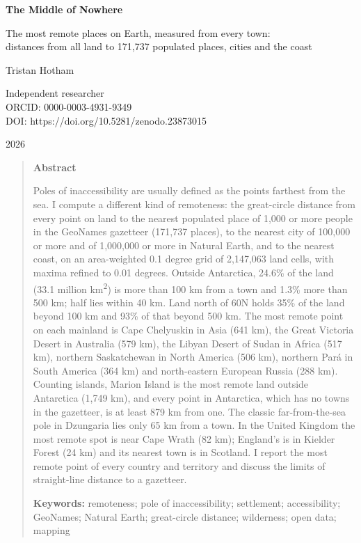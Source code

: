 \documentclass[11pt,a4paper]{article}
\begin{document}
\begin{center}
{\Large\bfseries The Middle of Nowhere\par}
\vspace{0.4em}
{\large The most remote places on Earth, measured from every town:\\distances from all land to 171,737 populated places, cities and the coast\par}
\vspace{1.2em}
{\large Tristan Hotham\par}
\vspace{0.3em}
{\small Independent researcher\\
ORCID: 0000-0003-4931-9349\\
DOI: https://doi.org/10.5281/zenodo.23873015\par}
\vspace{0.8em}
2026
\end{center}

\begin{quote}
\small
\begin{center}\textbf{Abstract}\end{center}
Poles of inaccessibility are usually defined as the points farthest from the sea. I compute a different kind of remoteness: the great-circle distance from every point on land to the nearest populated place of 1,000 or more people in the GeoNames gazetteer (171,737 places), to the nearest city of 100,000 or more and of 1,000,000 or more in Natural Earth, and to the nearest coast, on an area-weighted 0.1 degree grid of 2,147,063 land cells, with maxima refined to 0.01 degrees. Outside Antarctica, 24.6\% of the land (33.1 million km\textsuperscript{2}) is more than 100 km from a town and 1.3\% more than 500 km; half lies within 40 km. Land north of 60\textdegree N holds 35\% of the land beyond 100 km and 93\% of that beyond 500 km. The most remote point on each mainland is Cape Chelyuskin in Asia (641 km), the Great Victoria Desert in Australia (579 km), the Libyan Desert of Sudan in Africa (517 km), northern Saskatchewan in North America (506 km), northern Par\'a in South America (364 km) and north-eastern European Russia (288 km). Counting islands, Marion Island is the most remote land outside Antarctica (1,749 km), and every point in Antarctica, which has no towns in the gazetteer, is at least 879 km from one. The classic far-from-the-sea pole in Dzungaria lies only 65 km from a town. In the United Kingdom the most remote spot is near Cape Wrath (82 km); England's is in Kielder Forest (24 km) and its nearest town is in Scotland. I report the most remote point of every country and territory and discuss the limits of straight-line distance to a gazetteer.

\textbf{Keywords:} remoteness; pole of inaccessibility; settlement; accessibility; GeoNames; Natural Earth; great-circle distance; wilderness; open data; mapping
\end{quote}
\end{document}

